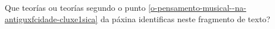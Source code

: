 \begin{ejercicio}[]
Que teorías ou teorías segundo o punto \ref{o-pensamento-musical--na-antiguxfcidade-cluxe1sica} da páxina \pageref{o-pensamento-musical--na-antiguxfcidade-cluxe1sica}  identificas neste fragmento de texto?
 \vspace*{0.50cm} %
\end{ejercicio}
%

